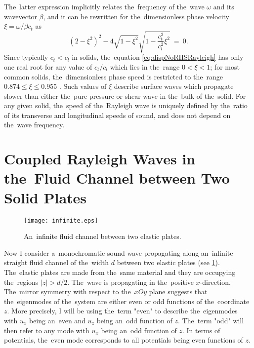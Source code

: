 The~latter expression implicitly relates the~frequency of the~wave $\omega$ and its wavevector $\beta$, and it can be rewritten for the~dimensionless phase velocity $\xi=\omega/\beta c_t$ as
\begin{equation}
\label{eq:dispNoRHSRayleigh}
\left(2-\xi^2\right)^2-4\sqrt{1-\xi^2}\sqrt{1-\frac{c_t^2}{c_l^2}\xi^2}~=~0.
\end{equation}
Since typically $c_t < c_l$ in solids, the~equation \cref{eq:dispNoRHSRayleigh} has only one real root for any value of $c_t/c_l$ which lies in the~range $0 < \xi < 1$; for most common solids, the~dimensionless phase speed is restricted to the~range $0.874 \le \xi \le 0.955$ \cite{LLtom7}.
Such values of $\xi$ describe surface waves which propagate slower than either the~pure pressure or shear wave in the~bulk of the~solid.
For any given solid, the~speed of the~Rayleigh wave is uniquely defined by the~ratio of its transverse and longitudinal speeds of sound, and does not depend on the~wave frequency.



\section{Coupled Rayleigh Waves in the~Fluid Channel between Two Solid Plates}

\begin{figure}
\begin{center}
\texttt{[image: infinite.eps]}
\caption{An~infinite fluid channel between two elastic plates.}
\label{fig:infinite}
\end{center}
\end{figure}

Now I consider a~monochromatic sound wave propagating along an~infinite straight fluid channel of the~width $d$ between two elastic plates (see \cref{fig:infinite}).
The~elastic plates are made from the~same material and they are occupying the~regions $|z| > d/2$.
The~wave is propagating in the~positive $x$-direction.
The~mirror symmetry with respect to the~$xOy$ plane suggests that the~eigenmodes of the~system are either even or odd functions of the~coordinate $z$.
More precisely, I will be using the~term "even" to describe the~eigenmodes with $u_x$ being an~even and $u_z$ being an~odd function of $z$.
The~term "odd" will then refer to any mode with $u_x$ being an~odd function of $z$.
In terms of potentials, the~even mode corresponds to all potentials being even functions of $z$.


